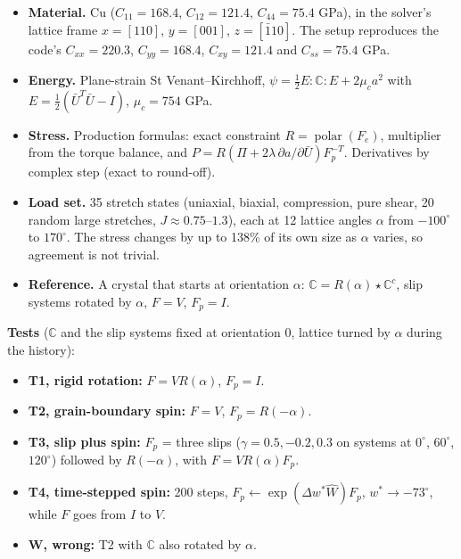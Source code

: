 \documentclass[
  11pt,
]{article}
\providecommand{\tightlist}{%
  \setlength{\itemsep}{0pt}\setlength{\parskip}{0pt}}
\begin{document}
\begin{itemize}
\tightlist
\item
  \textbf{Material.} Cu (\(C_{11}=168.4\), \(C_{12}=121.4\),
  \(C_{44}=75.4\) GPa), in the solver's lattice frame \(x=[110]\),
  \(y=[001]\), \(z=[\bar110]\). The setup reproduces the code's
  \(C_{xx}=220.3\), \(C_{yy}=168.4\), \(C_{xy}=121.4\) and
  \(C_{ss}=75.4\) GPa.
\item
  \textbf{Energy.} Plane-strain St Venant--Kirchhoff,
  \(\psi=\tfrac12E:\mathbb C:E+2\mu_ca^2\) with
  \(E=\tfrac12(\bar U^T\bar U-I)\), \(\mu_c=754\) GPa.
\item
  \textbf{Stress.} Production formulas: exact constraint
  \(R=\operatorname{polar}(F_e)\), multiplier from the torque balance,
  and \(P=R(\Pi+2\lambda\,\partial a/\partial\bar U)F_p^{-T}\).
  Derivatives by complex step (exact to round-off).
\item
  \textbf{Load set.} 35 stretch states (uniaxial, biaxial, compression,
  pure shear, 20 random large stretches, \(J\approx0.75\)--\(1.3\)),
  each at 12 lattice angles \(\alpha\) from \(-100^\circ\) to
  \(170^\circ\). The stress changes by up to 138\% of its own size as
  \(\alpha\) varies, so agreement is not trivial.
\item
  \textbf{Reference.} A crystal that starts at orientation \(\alpha\):
  \(\mathbb C=R(\alpha)\star\mathbb C^c\), slip systems rotated by
  \(\alpha\), \(F=V\), \(F_p=I\).
\end{itemize}

\textbf{Tests} (\(\mathbb C\) and the slip systems fixed at orientation
\(0\), lattice turned by \(\alpha\) during the history):

\begin{itemize}
\tightlist
\item
  \textbf{T1, rigid rotation:} \(F=VR(\alpha)\), \(F_p=I\).
\item
  \textbf{T2, grain-boundary spin:} \(F=V\), \(F_p=R(-\alpha)\).
\item
  \textbf{T3, slip plus spin:} \(F_p\) = three slips
  (\(\gamma=0.5,-0.2,0.3\) on systems at \(0^\circ\), \(60^\circ\),
  \(120^\circ\)) followed by \(R(-\alpha)\), with \(F=VR(\alpha)F_p\).
\item
  \textbf{T4, time-stepped spin:} 200 steps,
  \(F_p\leftarrow\exp(\Delta w^*\widehat W)F_p\), \(w^*\to-73^\circ\),
  while \(F\) goes from \(I\) to \(V\).
\item
  \textbf{W, wrong:} T2 with \(\mathbb C\) also rotated by \(\alpha\).
\end{itemize}
\end{document}
